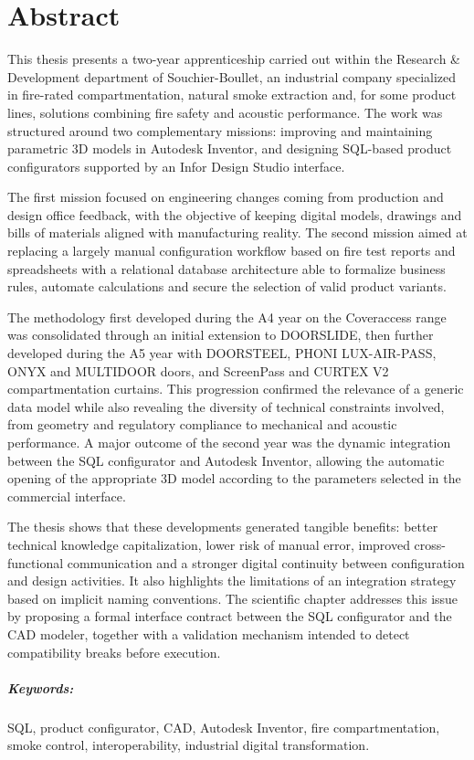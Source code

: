 \chapter*{Abstract}


This thesis presents a two-year apprenticeship carried out within the Research \& Development department of Souchier-Boullet, an industrial company specialized in fire-rated compartmentation, natural smoke extraction and, for some product lines, solutions combining fire safety and acoustic performance. The work was structured around two complementary missions: improving and maintaining parametric 3D models in Autodesk Inventor, and designing SQL-based product configurators supported by an Infor Design Studio interface.

The first mission focused on engineering changes coming from production and design office feedback, with the objective of keeping digital models, drawings and bills of materials aligned with manufacturing reality. The second mission aimed at replacing a largely manual configuration workflow based on fire test reports and spreadsheets with a relational database architecture able to formalize business rules, automate calculations and secure the selection of valid product variants.

The methodology first developed during the A4 year on the Coveraccess range was consolidated through an initial extension to DOORSLIDE, then further developed during the A5 year with DOORSTEEL, PHONI LUX-AIR-PASS, ONYX and MULTIDOOR doors, and ScreenPass and CURTEX V2 compartmentation curtains. This progression confirmed the relevance of a generic data model while also revealing the diversity of technical constraints involved, from geometry and regulatory compliance to mechanical and acoustic performance. A major outcome of the second year was the dynamic integration between the SQL configurator and Autodesk Inventor, allowing the automatic opening of the appropriate 3D model according to the parameters selected in the commercial interface.

The thesis shows that these developments generated tangible benefits: better technical knowledge capitalization, lower risk of manual error, improved cross-functional communication and a stronger digital continuity between configuration and design activities. It also highlights the limitations of an integration strategy based on implicit naming conventions. The scientific chapter addresses this issue by proposing a formal interface contract between the SQL configurator and the CAD modeler, together with a validation mechanism intended to detect compatibility breaks before execution.

\paragraph{Keywords:} SQL, product configurator, CAD, Autodesk Inventor, fire compartmentation, smoke control, interoperability, industrial digital transformation.

